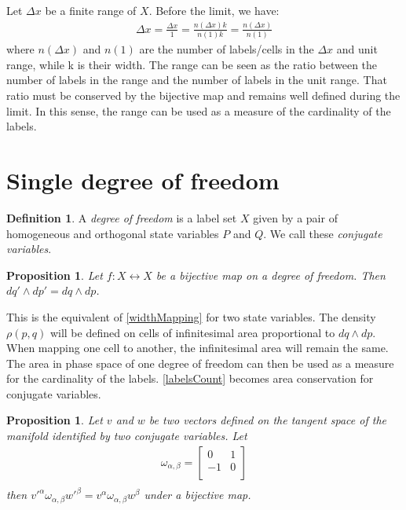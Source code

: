 \documentclass[twocolumn,floatfix,nofootinbib]{revtex4}   %
\theoremstyle{theorem}
\newtheorem{prop}[thm]{Proposition}
\theoremstyle{definition}
\newtheorem{defn}[thm]{Definition}
\begin{document}
Let $\Delta x$ be a finite range of $X$. Before the limit, we have:
\begin{align*}
\Delta x = \frac{\Delta x}{1} = \frac{n(\Delta x) k}{n(1) k} = \frac{n(\Delta x)}{n(1)}
\end{align*}
where $n(\Delta x)$ and $n(1)$ are the number of labels/cells in the $\Delta x$ and unit range, while k is their width. The range can be seen as the ratio between the number of labels in the range and the number of labels in the unit range. That ratio must be conserved by the bijective map and remains well defined during the limit. In this sense, the range can be used as a measure of the cardinality of the labels.

\section{Single degree of freedom}

\begin{defn}\label{sdof}
A \emph{degree of freedom} is a label set $X$ given by a pair of homogeneous and orthogonal state variables $P$ and $Q$. We call these \emph{conjugate variables}.
\end{defn}

\begin{prop}\label{sdofMap}
Let $f: X \leftrightarrow X$ be a bijective map on a degree of freedom. Then $dq' \wedge dp' = dq \wedge dp$.
\end{prop}

This is the equivalent of \ref{widthMapping} for two state variables. The density $\rho(p,q)$ will be defined on cells of infinitesimal area proportional to $dq \wedge dp$. When mapping one cell to another, the infinitesimal area will remain the same. The area in phase space of one degree of freedom can then be used as a measure for the cardinality of the labels. \ref{labelsCount} becomes area conservation for conjugate variables. 

\begin{prop}\label{sdofInvariant}
Let $v$ and $w$ be two vectors defined on the tangent space of the manifold identified by two conjugate variables. Let
\begin{align*}
\omega_{\alpha, \beta} = \left[
  \begin{array}{cc}
    0 & 1 \\
    -1 & 0 \\
  \end{array}
\right] \\
\end{align*}
then $v'^{\alpha} \omega_{\alpha, \beta} w'^{\beta}=v^{\alpha} \omega_{\alpha, \beta} w^{\beta}$ under a bijective map.
\end{prop}
\end{document}

